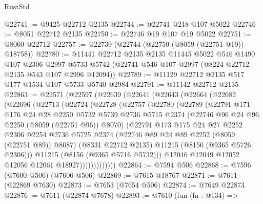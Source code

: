 \begin{lexlean}{RustStd}
\begin{coremodule}
{\begin{coremodule}
{{{{{{{{{{{{{{{{{{{{{{{{{{{{{{{{{{@22741 := @9425 @22712 @2135
@22744 := @22741 @218 @107 @5022
@22746 := @8051 @22712 @2135
@22750 := @22746 @19 @107 @19 @5022
@22751 := @8060 @22712
@22757 := @22739 (@22744 (@22750 (@8059 (@22751 @19)) @18758))
@22780 := @11441
    @22712
    @2135
    @2135
    @11445
    @5022
    @546
    @1490
    @107
    @2306
    @2997
    @5733
    @5742
    (@22741 @546 @107 @2997 (@8224 @22712 @2135 @543 @107 @2996 @12094))
@22789 := @11129 @22712 @2135 @517 @177 @1534 @107 @5733 @5740 @2984
@22791 := @11142 @22712 @2135
@22863 := @22571
    (@22597
      (@22639
        (@22641
          (@22643
            (@22664
              (@22682
                (@22696
                  (@22713
                    (@22724
                      (@22728
                        (@22757
                          (@22780
                            (@22789
                              (@22791
                                @171
                                @176
                                @24
                                @28
                                @2250
                                @5732
                                @5739
                                @2736
                                @5715
                                @2374
                                (@22746 @96 @24 @96 @2250 (@8059 (@22751 @96)) @8070)
                                (@22791
                                  @173
                                  @175
                                  @24
                                  @27
                                  @2252
                                  @2306
                                  @2254
                                  @2736
                                  @5725
                                  @2374
                                  (@22746 @89 @24 @89 @2252 (@8059 (@22751 @89)) @8087)
                                  (@8331 @22712 @2135)
                                  @11215
                                  (@8156 (@9365 @5726 @2306)))
                                @11215
                                (@8156 (@9365 @5716 @5732)))
                              @12046
                              @12049
                              @12052
                              @12056
                              @12061
                              @18927)))))))))))))
@22864 := @7594 @506
@22868 := @7596 (@7600 @506) (@7606 @506)
@22869 := @7615 @18767
@22871 := @7611 (@22869 @7630)
@22873 := @7653 (@7654 @506)
@22874 := @7649 @22873
@22876 := @7611 (@22874 @7678)
@22893 := @7610
    (fun (fn : @134) =>
}}}}}}}}}}}}}}}}}}}}}}}}}}}}}}}}}}
\end{coremodule}}
\end{coremodule}
\end{lexlean}
